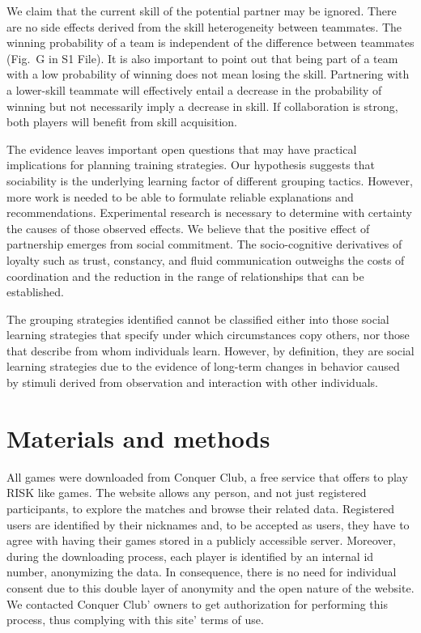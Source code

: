 \documentclass[a4paper,10pt]{book}
\theoremstyle{definition}
\begin{document}
We claim that the current skill of the potential partner may be ignored.
There are no side effects derived from the skill heterogeneity between teammates.
The winning probability of a team is independent of the difference between teammates (Fig.~G in S1 File).
It is also important to point out that being part of a team with a low probability of winning does not mean losing the skill.
Partnering with a lower-skill teammate will effectively entail a decrease in the probability of winning but not necessarily imply a decrease in skill.
If collaboration is strong, both players will benefit from skill acquisition.

The evidence leaves important open questions that may have practical implications for planning training strategies.
Our hypothesis suggests that sociability is the underlying learning factor of different grouping tactics.
However, more work is needed to be able to formulate reliable explanations and recommendations.
Experimental research is necessary to determine with certainty the causes of those observed effects.
We believe that the positive effect of partnership emerges from social commitment.
The socio-cognitive derivatives of loyalty such as trust, constancy, and fluid communication outweighs the costs of coordination and the reduction in the range of relationships that can be established.

The grouping strategies identified cannot be classified either into those social learning strategies that specify under which circumstances copy others, nor those that describe from whom individuals learn.
However, by definition, they are social learning strategies due to the evidence of long-term changes in behavior caused by stimuli derived from observation and interaction with other individuals.

\section{Materials and methods}


All games were downloaded from Conquer Club, a free service that offers to play RISK like games.
The website allows any person, and not just registered participants, to explore the matches and browse their related data.
Registered users are identified by their nicknames and, to be accepted as users, they have to agree with having their games stored in a publicly accessible server.
Moreover, during the downloading process, each player is identified by an internal id number, anonymizing the data.
In consequence, there is no need for individual consent due to this double layer of anonymity and the open nature of the website.
We contacted Conquer Club' owners to get authorization for performing this process, thus complying with this site' terms of use.
\end{document}
